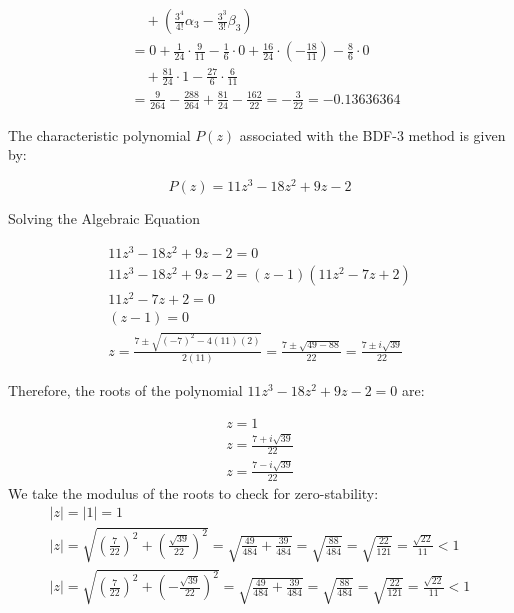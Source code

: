 \begin{align}
    &\quad+ \left(\frac{3^4}{4!} \alpha_3 - \frac{3^3}{3!} \beta_3 \right) \nonumber \\
    &= 0 + \frac{1}{24} \cdot \frac{9}{11} - \frac{1}{6} \cdot 0 + \frac{16}{24} \cdot \left(-\frac{18}{11}\right) - \frac{8}{6} \cdot 0 \nonumber \\
    &\quad+ \frac{81}{24} \cdot 1 - \frac{27}{6} \cdot \frac{6}{11} \nonumber \\
    &= \frac{9}{264} - \frac{288}{264} + \frac{81}{24} - \frac{162}{22} = -\frac{3}{22} = -0.13636364
\end{align}



The characteristic polynomial \(P(z)\) associated with the BDF-3 method is given by:

\begin{equation}
    P(z) = 11z^3 - 18z^2 + 9z - 2  
\end{equation}



Solving the Algebraic Equation 

\begin{eqnarray}
    11z^3 - 18z^2 + 9z - 2 = 0 \\
    11z^3 - 18z^2 + 9z - 2 = (z - 1)(11z^2 - 7z + 2) \\    
    11z^2 - 7z + 2 = 0 \\
    (z - 1) = 0 \\
    z = \frac{7 \pm \sqrt{(-7)^2 - 4(11)(2)}}{2(11)} = \frac{7 \pm \sqrt{49 - 88}}{22} = \frac{7 \pm i\sqrt{39}}{22} 
\end{eqnarray}

Therefore, the roots of the polynomial \(11z^3 - 18z^2 + 9z - 2 = 0\) are:

\begin{eqnarray}
    z = 1 \\
    z = \frac{7 + i\sqrt{39}}{22} \\
    z = \frac{7 - i\sqrt{39}}{22}
\end{eqnarray}
We take the modulus of the roots to check for zero-stability:
\begin{eqnarray}
    |z| = |1| = 1 \\
    |z| = \sqrt{\left(\frac{7}{22}\right)^2 + \left(\frac{\sqrt{39}}{22}\right)^2} = \sqrt{\frac{49}{484} + \frac{39}{484}} = \sqrt{\frac{88}{484}} = \sqrt{\frac{22}{121}} = \frac{\sqrt{22}}{11} < 1 \\
    |z| = \sqrt{\left(\frac{7}{22}\right)^2 + \left(-\frac{\sqrt{39}}{22}\right)^2} = \sqrt{\frac{49}{484} + \frac{39}{484}} = \sqrt{\frac{88}{484}} = \sqrt{\frac{22}{121}} = \frac{\sqrt{22}}{11} < 1
\end{eqnarray}

